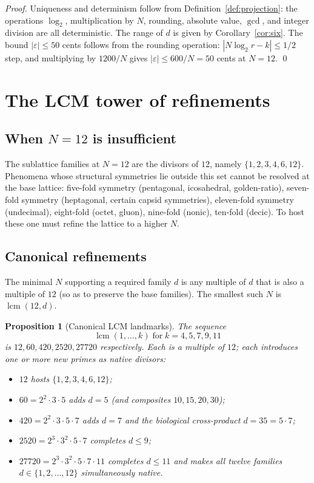 \documentclass[11pt,a4paper]{article}
\newtheorem{proposition}[theorem]{Proposition}
\theoremstyle{definition}
\theoremstyle{remark}
\DeclareMathOperator{\lcm}{lcm}
\newcommand{\eps}{\varepsilon}
\begin{document}
\begin{proof}
Uniqueness and determinism follow from Definition~\ref{def:projection}: the operations $\log_{2}$, multiplication by $N$, rounding, absolute value, $\gcd$, and integer division are all deterministic. The range of $d$ is given by Corollary~\ref{cor:six}. The bound $|\eps|\le 50$ cents follows from the rounding operation: $|N\log_{2}r - k|\le 1/2$ step, and multiplying by $1200/N$ gives $|\eps|\le 600/N=50$ cents at $N=12$. \qed
\end{proof}

\section{The LCM tower of refinements}\label{sec:tower}

\subsection{When $N=12$ is insufficient}

The sublattice families at $N=12$ are the divisors of $12$, namely $\{1,2,3,4,6,12\}$. Phenomena whose structural symmetries lie outside this set cannot be resolved at the base lattice: five-fold symmetry (pentagonal, icosahedral, golden-ratio), seven-fold symmetry (heptagonal, certain capsid symmetries), eleven-fold symmetry (undecimal), eight-fold (octet, gluon), nine-fold (nonic), ten-fold (decic). To host these one must refine the lattice to a higher $N$.

\subsection{Canonical refinements}

The minimal $N$ supporting a required family $d$ is any multiple of $d$ that is also a multiple of $12$ (so as to preserve the base families). The smallest such $N$ is $\lcm(12,d)$.

\begin{proposition}[Canonical LCM landmarks]\label{prop:tower}
The sequence
\[
\lcm(1,\ldots,k) \;\text{for}\; k=4,5,7,9,11
\]
is $12,60,420,2520,27720$ respectively. Each is a multiple of $12$; each introduces one or more new primes as native divisors:
\begin{itemize}[leftmargin=*]
\item $12$ hosts $\{1,2,3,4,6,12\}$;
\item $60 = 2^{2}\cdot 3\cdot 5$ adds $d=5$ (and composites $10,15,20,30$);
\item $420 = 2^{2}\cdot 3\cdot 5\cdot 7$ adds $d=7$ and the biological cross-product $d=35=5\cdot 7$;
\item $2520 = 2^{3}\cdot 3^{2}\cdot 5\cdot 7$ completes $d\le 9$;
\item $27720 = 2^{3}\cdot 3^{2}\cdot 5\cdot 7\cdot 11$ completes $d\le 11$ and makes all twelve families $d\in\{1,2,\ldots,12\}$ simultaneously native.
\end{itemize}
\end{proposition}
\end{document}
